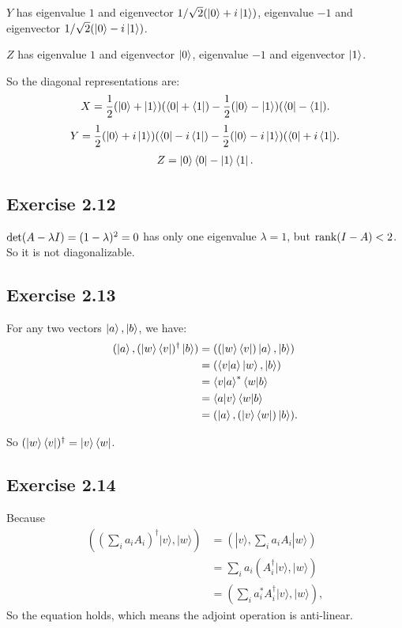 $Y$ has eigenvalue $1$ and eigenvector $1/\sqrt 2(\ket{0}+i\ket{1})$, eigenvalue $-1$ and eigenvector $1/\sqrt 2(\ket{0}-i\ket{1})$.

$Z$ has eigenvalue $1$ and eigenvector $\ket{0}$, eigenvalue $-1$ and eigenvector $\ket{1}$.

So the diagonal representations are:
\begin{align}
X=\frac{1}{2}(\ket{0}+\ket{1})(\bra{0}+\bra{1})-\frac{1}{2}(\ket{0}-\ket{1})(\bra{0}-\bra{1}).
 \end{align}
\begin{align}
Y=\frac{1}{2}(\ket{0}+i\ket{1})(\bra{0}-i\bra{1})-\frac{1}{2}(\ket{0}-i\ket{1})(\bra{0}+i\bra{1}).
 \end{align}
\begin{align}
Z=\ket{0}\bra{0}-\ket{1}\bra{1}.
 \end{align}

\subsection*{Exercise 2.12}

${\rm det}(A-\lambda I)=(1-\lambda)^2 = 0$ has only one eigenvalue $\lambda = 1$, but ${\rm rank}(I-A)<2$. So it is not diagonalizable.

\subsection*{Exercise 2.13}

For any two vectors $\ket{a},\ket{b}$, we have:
\begin{align}
(\ket{a},(\ket{w}\bra{v})^\dagger\ket{b})&=((\ket{w}\bra{v})\ket{a},\ket{b})\\
&=(\bra{v}\ket{a}\ket{w},\ket{b})\\
&=\bra{v}\ket{a}^*\bra{w}\ket{b}\\
&=\bra{a}\ket{v}\bra{w}\ket{b}\\
&=(\ket{a},(\ket{v}\bra{w})\ket{b}).
 \end{align}

So $(\ket{w}\bra{v})^\dagger=\ket{v}\bra{w}$.

\subsection*{Exercise 2.14}
Because
\begin{align}
\left(\left(\sum_{i} a_{i} A_{i}\right)^{\dagger}|v\rangle,|w\rangle\right) &=\left(|v\rangle, \sum_{i} a_{i} A_{i}|w\rangle\right) \\
&=\sum_{i} a_{i}\left(A_{i}^{\dagger}|v\rangle,|w\rangle\right) \\
&=\left(\sum_{i} a_{i}^{*} A_{i}^{\dagger}|v\rangle,|w\rangle\right),
 \end{align}
So the equation holds, which means the adjoint operation is anti-linear.

